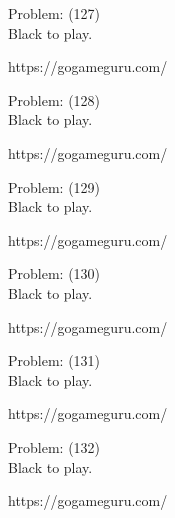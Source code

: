 \documentclass[11pt]{article}
\begin{document}
\begin{minipage}[t]{0.5\textwidth}
  {\centering
  
Problem: (127)\\
Black to play.

https://gogameguru.com/\\
  }
\end{minipage}
\begin{minipage}[t]{0.5\textwidth}
  {\centering
  
Problem: (128)\\
Black to play.

https://gogameguru.com/\\
  }
\end{minipage}
\begin{minipage}[t]{0.5\textwidth}
  {\centering
  
Problem: (129)\\
Black to play.

https://gogameguru.com/\\
  }
\end{minipage}
\begin{minipage}[t]{0.5\textwidth}
  {\centering
  
Problem: (130)\\
Black to play.

https://gogameguru.com/\\
  }
\end{minipage}
\begin{minipage}[t]{0.5\textwidth}
  {\centering
  
Problem: (131)\\
Black to play.

https://gogameguru.com/\\
  }
\end{minipage}
\begin{minipage}[t]{0.5\textwidth}
  {\centering
  
Problem: (132)\\
Black to play.

https://gogameguru.com/\\
  }
\end{minipage}
\end{document}
